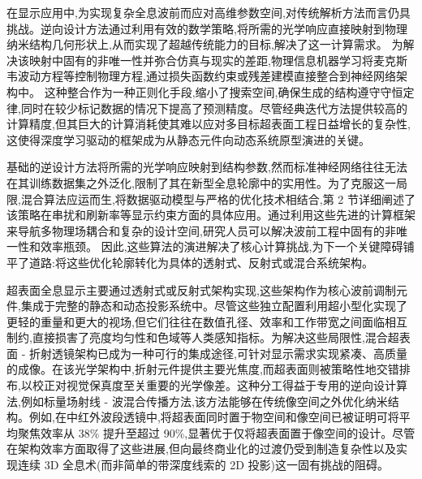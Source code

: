 \documentclass[11pt]{article}
\begin{document}
在显示应用中,为实现复杂全息波前而应对高维参数空间,对传统解析方法而言仍具挑战。逆向设计方法通过利用有效的数学策略,将所需的光学响应直接映射到物理纳米结构几何形状上,从而实现了超越传统能力的目标,解决了这一计算需求。\citep{doi_10_1117_12_3099014_831c7349} \citep{doi_10_1364_ol_567547_28becc59} 为解决该映射中固有的非唯一性并弥合仿真与现实的差距,物理信息机器学习将麦克斯韦波动方程等控制物理方程,通过损失函数约束或残差建模直接整合到神经网络架构中。\citep{doi_10_1002_adpr_202300158_66d61883} 这种整合作为一种正则化手段,缩小了搜索空间,确保生成的结构遵守守恒定律,同时在较少标记数据的情况下提高了预测精度。尽管经典迭代方法提供较高的计算精度,但其巨大的计算消耗使其难以应对多目标超表面工程日益增长的复杂性,这使得深度学习驱动的框架成为从静态元件向动态系统原型演进的关键。\citep{doi_10_1088_1361_6439_ad3a72_72d60f33} \citep{doi_10_1002_adpr_202300158_66d61883} \citep{doi_10_71465_fapm546_bda368a5}

基础的逆设计方法将所需的光学响应映射到结构参数,然而标准神经网络往往无法在其训练数据集之外泛化,限制了其在新型全息轮廓中的实用性。为了克服这一局限,混合算法应运而生,将数据驱动模型与严格的优化技术相结合,第 2 节详细阐述了该策略在串扰和刷新率等显示约束方面的具体应用。通过利用这些先进的计算框架来导航多物理场耦合和复杂的设计空间,研究人员可以解决波前工程中固有的非唯一性和效率瓶颈。\citep{doi_10_1038_s41467_026_76714_x_8ca5d39b} 因此,这些算法的演进解决了核心计算挑战,为下一个关键障碍铺平了道路:将这些优化轮廓转化为具体的透射式、反射式或混合系统架构。\citep{doi_10_1021_acsphotonics_2c00968_06a2e96b} \citep{doi_10_1038_s41467_026_76714_x_8ca5d39b} \citep{doi_10_5757_asct_2023_32_6_141_32febf1c}

超表面全息显示主要通过透射式或反射式架构实现,这些架构作为核心波前调制元件,集成于完整的静态和动态投影系统中。尽管这些独立配置利用超小型化实现了更轻的重量和更大的视场,但它们往往在数值孔径、效率和工作带宽之间面临相互制约,直接损害了亮度均匀性和色域等人类感知指标。为解决这些局限性,混合超表面 - 折射透镜架构已成为一种可行的集成途径,可针对显示需求实现紧凑、高质量的成像。在该光学架构中,折射元件提供主要光焦度,而超表面则被策略性地交错排布,以校正对视觉保真度至关重要的光学像差。这种分工得益于专用的逆向设计算法,例如标量场射线 - 波混合传播方法,该方法能够在传统像空间之外优化纳米结构。例如,在中红外波段透镜中,将超表面同时置于物空间和像空间已被证明可将平均聚焦效率从 38\% 提升至超过 90\%,显著优于仅将超表面置于像空间的设计。尽管在架构效率方面取得了这些进展,但向最终商业化的过渡仍受到制造复杂性以及实现连续 3D 全息术(而非简单的带深度线索的 2D 投影)这一固有挑战的阻碍。\citep{doi_10_1515_nanoph_2025_0269_b999ce93} \citep{doi_10_1364_ao_516890_6221deea}
\end{document}
